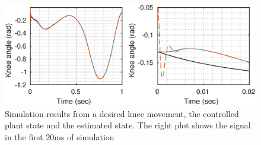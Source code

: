 \documentclass[letterpaper, 10 pt, conference]{ieeeconf}  %
\theoremstyle{plain}
\theoremstyle{definition}
\theoremstyle{remark}
\begin{document}
%
%
%
%
\begin{figure}[h!]
	\begin{center}
	\includegraphics[width = \columnwidth]{Figs/q_knee_mu_fix_1e-03.eps}
	\caption{ Simulation results from a desired knee movement, the controlled plant state and the estimated state. The right plot shows the signal in the first 20ms of simulation}
	\label{fig:knee}
	\end{center}
\end{figure}
%
%
%
%
%
%
\end{document}
